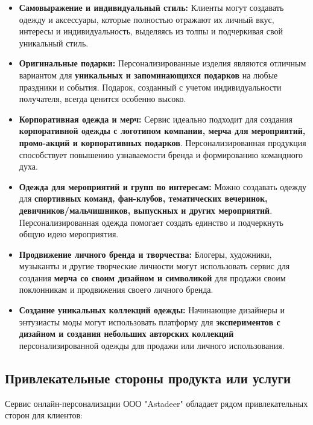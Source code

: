 \begin{itemize}
    \item \textbf{Самовыражение и индивидуальный стиль:}  Клиенты могут создавать одежду и аксессуары, которые полностью отражают их личный вкус, интересы и индивидуальность, выделяясь из толпы и подчеркивая свой уникальный стиль.
    \item \textbf{Оригинальные подарки:}  Персонализированные изделия являются отличным вариантом для \textbf{уникальных и запоминающихся подарков} на любые праздники и события.  Подарок, созданный с учетом индивидуальности получателя, всегда ценится особенно высоко.
    \item \textbf{Корпоративная одежда и мерч:}  Сервис идеально подходит для создания \textbf{корпоративной одежды с логотипом компании, мерча для мероприятий, промо-акций и корпоративных подарков}.  Персонализированная продукция способствует повышению узнаваемости бренда и формированию командного духа.
    \item \textbf{Одежда для мероприятий и групп по интересам:}  Можно создавать одежду для \textbf{спортивных команд, фан-клубов, тематических вечеринок, девичников/мальчишников, выпускных и других мероприятий}.  Персонализированная одежда помогает создать единство и подчеркнуть общую идею мероприятия.
    \item \textbf{Продвижение личного бренда и творчества:}  Блогеры, художники, музыканты и другие творческие личности могут использовать сервис для создания \textbf{мерча со своим дизайном и символикой} для продажи своим поклонникам и продвижения своего личного бренда.
    \item \textbf{Создание уникальных коллекций одежды:}  Начинающие дизайнеры и энтузиасты моды могут использовать платформу для \textbf{экспериментов с дизайном и создания небольших авторских коллекций} персонализированной одежды для продажи или личного использования.
\end{itemize}

\subsection{Привлекательные стороны продукта или услуги}

Сервис онлайн-персонализации ООО "Astadeer" обладает рядом привлекательных сторон для клиентов:

